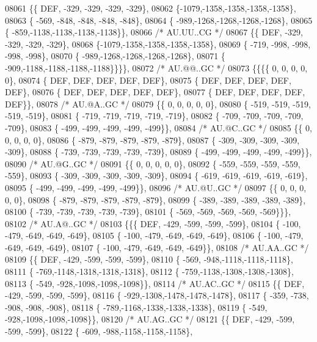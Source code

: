 \begin{DoxyCode}
08061 \{\{  DEF, -329, -329, -329, -329\},
08062 \{-1079,-1358,-1358,-1358,-1358\},
08063 \{ -569, -848, -848, -848, -848\},
08064 \{ -989,-1268,-1268,-1268,-1268\},
08065 \{ -859,-1138,-1138,-1138,-1138\}\},
08066 \textcolor{comment}{/* AU.UU..CG */}
08067 \{\{  DEF, -329, -329, -329, -329\},
08068 \{-1079,-1358,-1358,-1358,-1358\},
08069 \{ -719, -998, -998, -998, -998\},
08070 \{ -989,-1268,-1268,-1268,-1268\},
08071 \{ -909,-1188,-1188,-1188,-1188\}\}\}\},
08072 \textcolor{comment}{/* AU.@@..GC */}
08073 \{\{\{\{    0,    0,    0,    0,    0\},
08074 \{  DEF,  DEF,  DEF,  DEF,  DEF\},
08075 \{  DEF,  DEF,  DEF,  DEF,  DEF\},
08076 \{  DEF,  DEF,  DEF,  DEF,  DEF\},
08077 \{  DEF,  DEF,  DEF,  DEF,  DEF\}\},
08078 \textcolor{comment}{/* AU.@A..GC */}
08079 \{\{    0,    0,    0,    0,    0\},
08080 \{ -519, -519, -519, -519, -519\},
08081 \{ -719, -719, -719, -719, -719\},
08082 \{ -709, -709, -709, -709, -709\},
08083 \{ -499, -499, -499, -499, -499\}\},
08084 \textcolor{comment}{/* AU.@C..GC */}
08085 \{\{    0,    0,    0,    0,    0\},
08086 \{ -879, -879, -879, -879, -879\},
08087 \{ -309, -309, -309, -309, -309\},
08088 \{ -739, -739, -739, -739, -739\},
08089 \{ -499, -499, -499, -499, -499\}\},
08090 \textcolor{comment}{/* AU.@G..GC */}
08091 \{\{    0,    0,    0,    0,    0\},
08092 \{ -559, -559, -559, -559, -559\},
08093 \{ -309, -309, -309, -309, -309\},
08094 \{ -619, -619, -619, -619, -619\},
08095 \{ -499, -499, -499, -499, -499\}\},
08096 \textcolor{comment}{/* AU.@U..GC */}
08097 \{\{    0,    0,    0,    0,    0\},
08098 \{ -879, -879, -879, -879, -879\},
08099 \{ -389, -389, -389, -389, -389\},
08100 \{ -739, -739, -739, -739, -739\},
08101 \{ -569, -569, -569, -569, -569\}\}\},
08102 \textcolor{comment}{/* AU.A@..GC */}
08103 \{\{\{  DEF, -429, -599, -599, -599\},
08104 \{ -100, -479, -649, -649, -649\},
08105 \{ -100, -479, -649, -649, -649\},
08106 \{ -100, -479, -649, -649, -649\},
08107 \{ -100, -479, -649, -649, -649\}\},
08108 \textcolor{comment}{/* AU.AA..GC */}
08109 \{\{  DEF, -429, -599, -599, -599\},
08110 \{ -569, -948,-1118,-1118,-1118\},
08111 \{ -769,-1148,-1318,-1318,-1318\},
08112 \{ -759,-1138,-1308,-1308,-1308\},
08113 \{ -549, -928,-1098,-1098,-1098\}\},
08114 \textcolor{comment}{/* AU.AC..GC */}
08115 \{\{  DEF, -429, -599, -599, -599\},
08116 \{ -929,-1308,-1478,-1478,-1478\},
08117 \{ -359, -738, -908, -908, -908\},
08118 \{ -789,-1168,-1338,-1338,-1338\},
08119 \{ -549, -928,-1098,-1098,-1098\}\},
08120 \textcolor{comment}{/* AU.AG..GC */}
08121 \{\{  DEF, -429, -599, -599, -599\},
08122 \{ -609, -988,-1158,-1158,-1158\},

\end{DoxyCode}

